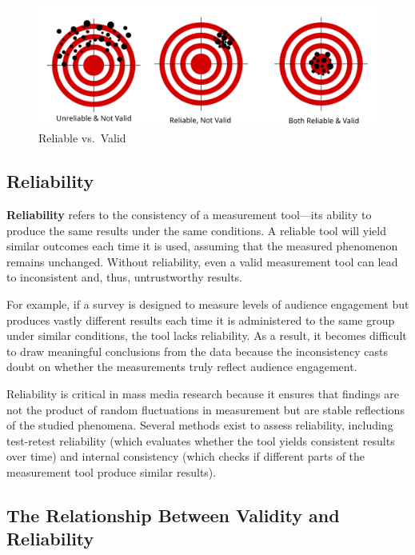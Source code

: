 \documentclass[
]{book}
\begin{document}
\begin{figure}
\centering
\includegraphics[width=1\textwidth,height=\textheight]{images/rel-val.png}
\caption{Reliable vs.~Valid}
\end{figure}

\subsection*{Reliability}\label{reliability}

\textbf{Reliability} refers to the consistency of a measurement tool---its ability to produce the same results under the same conditions. A reliable tool will yield similar outcomes each time it is used, assuming that the measured phenomenon remains unchanged. Without reliability, even a valid measurement tool can lead to inconsistent and, thus, untrustworthy results.

For example, if a survey is designed to measure levels of audience engagement but produces vastly different results each time it is administered to the same group under similar conditions, the tool lacks reliability. As a result, it becomes difficult to draw meaningful conclusions from the data because the inconsistency casts doubt on whether the measurements truly reflect audience engagement.

Reliability is critical in mass media research because it ensures that findings are not the product of random fluctuations in measurement but are stable reflections of the studied phenomena. Several methods exist to assess reliability, including test-retest reliability (which evaluates whether the tool yields consistent results over time) and internal consistency (which checks if different parts of the measurement tool produce similar results).

\subsection*{The Relationship Between Validity and Reliability}\label{the-relationship-between-validity-and-reliability}
\end{document}
